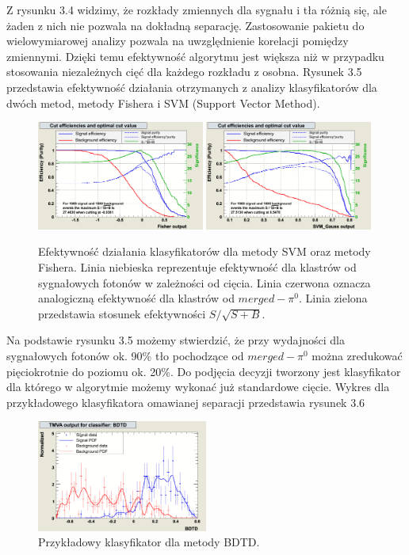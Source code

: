 \documentclass{pracamgr}
\begin{document}
\noindent
Z rysunku 3.4 widzimy, że rozkłady zmiennych dla sygnału i tła różnią się, ale żaden z nich nie pozwala na dokładną separację. Zastosowanie pakietu do wielowymiarowej analizy pozwala na uwzględnienie korelacji pomiędzy zmiennymi. Dzięki temu efektywność algorytmu jest większa niż w przypadku stosowania niezależnych cięć dla każdego rozkładu z osobna. Rysunek 3.5 przedstawia efektywność działania otrzymanych z analizy klasyfikatorów dla dwóch metod, metody Fishera i SVM (Support Vector Method).\\
\begin{figure}[!h]
 \centering
 \includegraphics[width=0.49\textwidth]{rysunki/tmva/effFisher.png}
 \includegraphics[width=0.49\textwidth]{rysunki/tmva/effSVM.png}
 \caption{Efektywność działania klasyfikatorów dla metody SVM oraz metody Fishera. Linia niebieska reprezentuje efektywność dla klastrów od sygnałowych fotonów w zależności od cięcia. Linia czerwona oznacza analogiczną efektywność dla klastrów od $merged-\pi^0$. Linia zielona przedstawia stosunek efektywności $S/\sqrt{S+B}$.}
\end{figure}

\noindent
Na podstawie rysunku 3.5 możemy stwierdzić, że przy wydajności dla sygnałowych fotonów ok. 90\% tło pochodzące od $merged-\pi^0$ można zredukować pięciokrotnie do poziomu ok. 20\%. Do podjęcia decyzji tworzony jest klasyfikator dla którego w algorytmie możemy wykonać już standardowe cięcie. Wykres dla przykładowego klasyfikatora omawianej separacji przedstawia rysunek 3.6 \\
\begin{figure}[!h]
 \centering
 \includegraphics[width=0.5\textwidth]{rysunki/tmva/classifierBDTD.png}
 \caption{Przykładowy klasyfikator dla metody BDTD.}
\end{figure}
\end{document}
